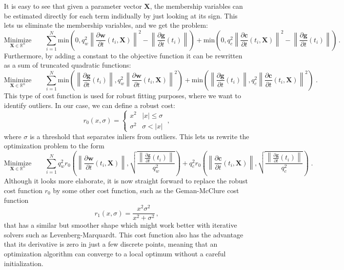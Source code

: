 \documentclass{article}
\newcommand{\quality}[1]{q_{#1}}
\newcommand{\minfun}{\text{min}}
\newcommand{\realvec}[1]{\mathbf{#1}}
\newcommand{\norm}[1]{\left\| #1 \right\|}
\newcommand{\derivative}[2]{\frac{\partial #1}{\partial #2}}
\newcommand{\timederivative}[1]{\derivative{#1}{t}}
\newcommand{\realnumber}{\mathbb{R}}
\begin{document}
It is easy to see that given a parameter vector $\realvec{X}$, the membership variables can be estimated directly for each term indidually by just looking at its sign. This lets us eliminate the membership variables, and we get the problem:
\begin{displaymath}
\underset{\realvec{X} \in \realnumber^n}{\text{Minimize}} \qquad \sum_{i = 1}^N  \minfun\left(0, \quality{w}^2\norm{\timederivative{\realvec{w}}(t_i, \realvec{X})}^2 - \norm{\timederivative{\realvec{g}}(t_i)}\right)
+ \minfun\left(0, \quality{c}^2\norm{\timederivative{\realvec{c}}(t_i, \realvec{X})}^2 - \norm{\timederivative{\realvec{g}}(t_i)}\right) \, .
\end{displaymath}
Furthermore, by adding a constant to the objective function it can be rewritten as a sum of truncated quadratic functions:
\begin{displaymath}
\underset{\realvec{X} \in \realnumber^n}{\text{Minimize}} \qquad \sum_{i = 1}^N  \minfun\left(\norm{\timederivative{\realvec{g}}(t_i)}, \quality{w}^2\norm{\timederivative{\realvec{w}}(t_i, \realvec{X})}^2\right)
+ \minfun\left(\norm{\timederivative{\realvec{g}}(t_i)}, \quality{c}^2\norm{\timederivative{\realvec{c}}(t_i, \realvec{X})}^2\right) \; .
\end{displaymath}
This type of cost function is used for robust fitting purposes, where we want to identify outliers. In our case, we can define a robust cost:
\begin{displaymath}
r_0(x, \sigma) =
\left\{
\begin{array}{ll}
  x^2 & |x| \leqslant \sigma \\
  \sigma^2 & \sigma < |x|
\end{array}
\right. \; ,
\end{displaymath}
where $\sigma$ is a threshold that separates inliers from outliers. This lets us rewrite the optimization problem to the form
\begin{displaymath}
\underset{\realvec{X} \in \realnumber^n}{\text{Minimize}} \qquad \sum_{i = 1}^N 
\quality{w}^2r_0\left(\norm{\timederivative{\realvec{w}}(t_i, \realvec{X})}, \sqrt{\frac{\norm{\timederivative{\realvec{g}}(t_i)}}{\quality{w}^2}}\right) + 
\quality{c}^2r_0\left(\norm{\timederivative{\realvec{c}}(t_i, \realvec{X})}, \sqrt{\frac{\norm{\timederivative{\realvec{g}}(t_i)}}{\quality{c}^2}}\right)\; .
\end{displaymath}
Although it looks more elaborate, it is now straight forward to replace the robust cost function $r_0$ by some other cost function, such as the Geman-McClure cost function
\begin{displaymath}
r_1(x, \sigma) = \frac{x^2\sigma^2}{x^2 + \sigma^2}\,,
\end{displaymath}
that has a similar but smoother shape which might work better with iterative solvers such as Levenberg-Marquardt. This cost function also has the advantage that its derivative is zero in just a few discrete points, meaning that an optimization algorithm can converge to a local optimum without a careful initialization.
\end{document}
